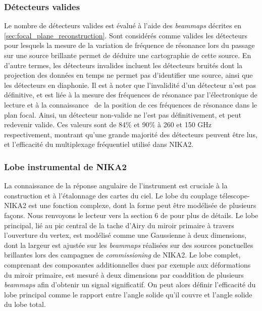 \subsubsection{Détecteurs valides} %
Le nombre de détecteurs valides est évalué à l'aide des \textit{beammaps} décrites en \ref{sec:focal_plane_reconstruction}.
Sont considérés comme valides les détecteurs pour lesquels la mesure de la variation de fréquence de résonance lors du passage sur une source brillante permet de déduire une cartographie de cette source.
En d'autre termes, les détecteurs invalides incluent les détecteurs bruités dont la projection des données en temps ne permet pas d'identifier une source, ainsi que les détecteurs en diaphonie.
Il est à noter que l'invalidité d'un détecteur n'est pas définitive, et est liée à la mesure des fréquences de résonance par l'électronique de lecture et à la connaissance \prior\ de la position de ces fréquences de résonance dans le plan focal.
Ainsi, un détecteur non-valide ne l'est pas définitivement, et peut redevenir valide.
Ces valeurs sont de 84\% et 90\% à 260 et 150 GHz respectivement, montrant qu'une grande majorité des détecteurs peuvent être lus, et l'efficacité du multiplexage fréquentiel utilisé dans NIKA2.

\subsubsection{Lobe instrumental de NIKA2} %
La connaissance de la réponse angulaire de l'instrument est cruciale à la construction et à l'étalonnage des cartes du ciel.
Le lobe du couplage télescope-NIKA2 est une fonction complexe, dont la forme peut être modélisée de plusieurs façons.
Nous renvoyons le lecteur vers la section 6 de \cite{perotto_calibration_2020} pour plus de détails.
Le lobe principal, lié au pic central de la tache d'Airy du miroir primaire à travers l'ouverture du vertex, est modélisé comme une Gaussienne à deux dimensions, dont la largeur est ajustée sur les \textit{beammaps} réalisées sur des sources ponctuelles brillantes lors des campagnes de \textit{commissioning} de NIKA2.
Le lobe complet, comprenant des composantes additionnelles dues par exemple aux déformations du miroir primaire, est mesuré à deux dimensions par coaddition de plusieurs \textit{beammaps} afin d'obtenir un signal significatif.
On peut alors définir l'efficacité du lobe principal comme le rapport entre l'angle solide qu'il couvre et l'angle solide du lobe total.

